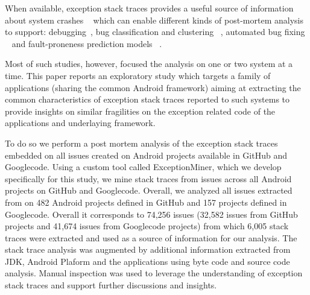 \documentclass[conference]{IEEEtran}
\begin{document}

When available, exception stack traces provides a useful source of information about system crashes ~\cite{bettenburg2008makes} which 
 can enable different kinds of post-mortem analysis to support:  debugging~\cite{schroter2010stack}, 
 bug classification and clustering ~\cite{wang2013improving, kim2011crash, dhaliwal2011classifying},  
automated bug fixing ~\cite{sinha2009fault} and fault-proneness prediction models ~\cite{kim2013predicting}. 

Most of such studies, however, focused the analysis on one or two system at a time.
This paper reports an exploratory study which targets a family of applications 
(sharing the common Android framework) aiming at extracting 
the common characteristics of exception stack traces reported to such systems to provide
insights on similar fragilities on the exception related code of the applications and underlaying framework.


To do so we perform a post mortem analysis of the exception stack traces embedded on all issues
created on Android projects available in GitHub and Googlecode. Using a custom tool called ExceptionMiner,
 which we develop specifically for this study, we mine stack traces from issues across all Android projects on
GitHub and Googlecode. Overall, we analyzed all issues extracted from on 482 Android projects defined in
GitHub and 157 projects defined in Googlecode. Overall it corresponds to 74,256 issues (32,582 issues from GitHub projects 
and 41,674 issues from Googlecode projects) from which  6,005 stack traces were extracted and used as
 a source of information for our analysis. The stack trace analysis was augmented by additional information
extracted from JDK, Android Plaform and the applications using byte code and source code analysis.
 Manual inspection was used to leverage the understanding of exception stack traces and support further discussions and insights.

\end{document}
